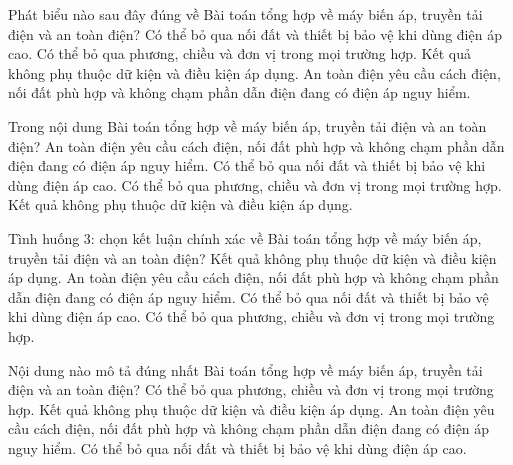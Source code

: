 \begin{ex}
Phát biểu nào sau đây đúng về Bài toán tổng hợp về máy biến áp, truyền tải điện và an toàn điện?
\choice
{Có thể bỏ qua nối đất và thiết bị bảo vệ khi dùng điện áp cao.}
{Có thể bỏ qua phương, chiều và đơn vị trong mọi trường hợp.}
{Kết quả không phụ thuộc dữ kiện và điều kiện áp dụng.}
{\True An toàn điện yêu cầu cách điện, nối đất phù hợp và không chạm phần dẫn điện đang có điện áp nguy hiểm.}
\end{ex}

\begin{ex}
Trong nội dung Bài toán tổng hợp về máy biến áp, truyền tải điện và an toàn điện?
\choice
{\True An toàn điện yêu cầu cách điện, nối đất phù hợp và không chạm phần dẫn điện đang có điện áp nguy hiểm.}
{Có thể bỏ qua nối đất và thiết bị bảo vệ khi dùng điện áp cao.}
{Có thể bỏ qua phương, chiều và đơn vị trong mọi trường hợp.}
{Kết quả không phụ thuộc dữ kiện và điều kiện áp dụng.}
\end{ex}

\begin{ex}
Tình huống 3: chọn kết luận chính xác về Bài toán tổng hợp về máy biến áp, truyền tải điện và an toàn điện?
\choice
{Kết quả không phụ thuộc dữ kiện và điều kiện áp dụng.}
{\True An toàn điện yêu cầu cách điện, nối đất phù hợp và không chạm phần dẫn điện đang có điện áp nguy hiểm.}
{Có thể bỏ qua nối đất và thiết bị bảo vệ khi dùng điện áp cao.}
{Có thể bỏ qua phương, chiều và đơn vị trong mọi trường hợp.}
\end{ex}

\begin{ex}
Nội dung nào mô tả đúng nhất Bài toán tổng hợp về máy biến áp, truyền tải điện và an toàn điện?
\choice
{Có thể bỏ qua phương, chiều và đơn vị trong mọi trường hợp.}
{Kết quả không phụ thuộc dữ kiện và điều kiện áp dụng.}
{\True An toàn điện yêu cầu cách điện, nối đất phù hợp và không chạm phần dẫn điện đang có điện áp nguy hiểm.}
{Có thể bỏ qua nối đất và thiết bị bảo vệ khi dùng điện áp cao.}
\end{ex}

